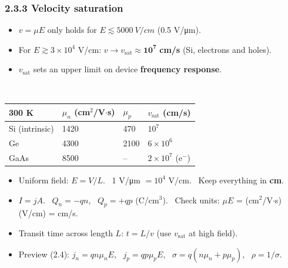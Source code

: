     \subsubsection{2.3.3 Velocity saturation}
    \begin{minipage}[c]{0.36\linewidth}
    \end{minipage}\hfill
    \begin{minipage}[c]{0.6\linewidth}\raggedright
        \begin{itemize}
            \item $v = \mu E$ only holds for $E \lesssim \SI{5000}{V/cm}$ (0.5 V/\si{\micro\metre}).
            \item For $E \gtrsim 3\times10^4$ V/cm: $v \to v_{\mathrm{sat}} \approx \mathbf{10^7}$ \textbf{cm/s} (Si, electrons and holes).
            \item $v_{\mathrm{sat}}$ sets an upper limit on device \textbf{frequency response}.
        \end{itemize}
    \end{minipage}\\[2pt]
    \begin{tabular}{|l|l|l|l|}
        \hline
        \textbf{300 K} & $\mu_n$ (cm$^2$/V$\cdot$s) & $\mu_p$ & $v_{\mathrm{sat}}$ (cm/s) \\ \hline
        Si (intrinsic) & 1420 & 470 & $10^7$ \\ \hline
        Ge & 4300 & 2100 & $6\times10^6$ \\ \hline
        GaAs & 8500 & -- & $2\times10^7$ (e$^-$) \\ \hline
    \end{tabular}

    \begin{handy}
        \begin{itemize}
            \item Uniform field: $E = V/L$. \ 1 V/\si{\micro\metre} $= 10^4$ V/cm. \ Keep everything in \textbf{cm}.
            \item $I = jA$. \ $Q_n = -qn$, \ $Q_p = +qp$ (C/cm$^3$). \ Check units: $\mu E$ = (cm$^2$/V$\cdot$s)(V/cm) = cm/s.
            \item Transit time across length $L$: $t = L/v$ (use $v_{\mathrm{sat}}$ at high field).
            \item Preview (2.4): $j_n = qn\mu_nE$, \ $j_p = qp\mu_pE$, \ $\sigma = q(n\mu_n + p\mu_p)$, \ $\rho = 1/\sigma$.
        \end{itemize}
    \end{handy}

